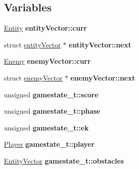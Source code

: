 \subsection*{Variables}
\begin{DoxyCompactItemize}
\item 
\mbox{\label{group__GameState_ga93b9644b5267eb790f5f5064ffec6ea7}} 
\hyperlink{structentity__t}{Entity} {\bfseries entity\+Vector\+::curr}
\item 
\mbox{\label{group__GameState_gaa117367bd46937897e54b6db9267690c}} 
struct \hyperlink{structentityVector}{entity\+Vector} $\ast$ {\bfseries entity\+Vector\+::next}
\item 
\mbox{\label{group__GameState_gabf526bfef7933f4bcd2c63f4d682bf6a}} 
\hyperlink{structenemy__t}{Enemy} {\bfseries enemy\+Vector\+::curr}
\item 
\mbox{\label{group__GameState_gad5177a584901049a83ccef6a59df6f4f}} 
struct \hyperlink{structenemyVector}{enemy\+Vector} $\ast$ {\bfseries enemy\+Vector\+::next}
\item 
\mbox{\label{group__GameState_gaa5fb4d062e3abeb688a28376a6e5d6be}} 
unsigned {\bfseries gamestate\+\_\+t\+::score}
\item 
\mbox{\label{group__GameState_gafe71b0ccd4cefe460e7b246e0424b205}} 
unsigned {\bfseries gamestate\+\_\+t\+::phase}
\item 
\mbox{\label{group__GameState_ga1f85d395865a1a84da692ce61c3123ed}} 
unsigned {\bfseries gamestate\+\_\+t\+::ek}
\item 
\mbox{\label{group__GameState_gaef3c5d472ae5e2e78389eca5991e3bd6}} 
\hyperlink{structplayer__t}{Player} {\bfseries gamestate\+\_\+t\+::player}
\item 
\mbox{\label{group__GameState_gae543438c6ffc4e64005f27ee00023a4d}} 
\hyperlink{structentityVector}{Entity\+Vector} {\bfseries gamestate\+\_\+t\+::obstacles}
\item 
\mbox{\label{group__GameState_ga2eace96a13a7b977a3ed14e35e203ab6}} 

\end{DoxyCompactItemize}
